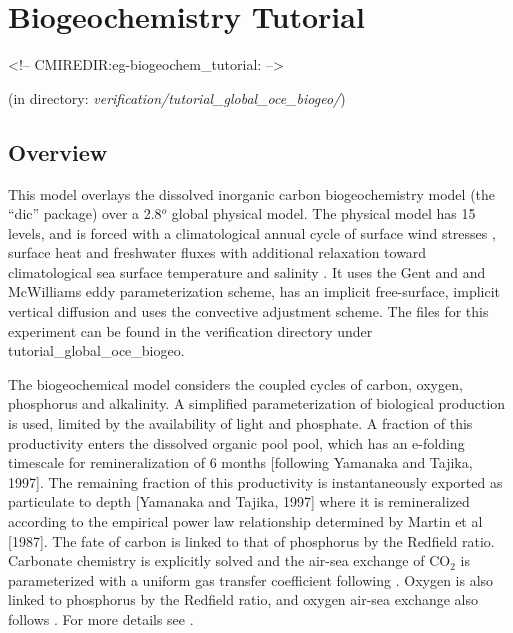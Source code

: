 \section{Biogeochemistry Tutorial}
\label{www:tutorials}
\label{sect:eg-biogeochem_tutorial}
\begin{rawhtml}
<!-- CMIREDIR:eg-biogeochem_tutorial: -->
\end{rawhtml}
\begin{center}
(in directory: {\it verification/tutorial\_global\_oce\_biogeo/})
\end{center}

\subsection{Overview}
This model overlays the dissolved inorganic carbon biogeochemistry
model (the ``dic'' package) over a 2.8$^o$ global physical model. The
physical model has 15 levels, and is forced with a climatological
annual cycle of surface wind stresses \cite{Trenberth_etal_89},
surface heat and freshwater fluxes \cite{jiang99} with additional
relaxation toward climatological sea surface temperature and salinity
\cite{lev:94a,Levitus94}.  It uses the Gent and and McWilliams
\cite{gen-mcw:90} eddy parameterization scheme, has an implicit
free-surface, implicit vertical diffusion and uses the convective
adjustment scheme. The files for this experiment can be found in
the verification directory under tutorial\_global\_oce\_biogeo.

The biogeochemical model considers the coupled cycles of carbon,
oxygen, phosphorus and alkalinity.  A simplified parameterization of
biological production is used, limited by the availability of light
and phosphate.  A fraction of this productivity enters the dissolved
organic pool pool, which has an e-folding timescale for
remineralization of 6 months [following Yamanaka and Tajika, 1997].
The remaining fraction of this productivity is instantaneously
exported as particulate to depth [Yamanaka and Tajika, 1997] where it
is remineralized according to the empirical power law relationship
determined by Martin et al [1987].  The fate of carbon is linked to
that of phosphorus by the Redfield ratio. Carbonate chemistry is
explicitly solved \cite{Follows_etal_05} and the air-sea exchange of
CO$_2$ is parameterized with a uniform gas transfer coefficient
following \cite{Wanninkhof_92}. Oxygen is also linked to phosphorus by
the Redfield ratio, and oxygen air-sea exchange also follows
\cite{Wanninkhof_92}.  For more details see \cite{Dutkiewicz_etal_05}.

